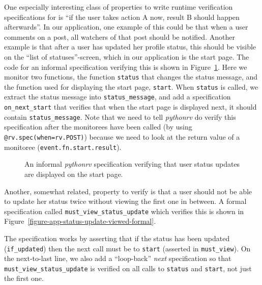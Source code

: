 One especially interesting class of properties to write runtime verification
specifications for is ``if the user takes action A now, result B should happen
afterwards''. In our application, one example of this could be that when a user
comments on a post, all watchers of that post should be notified. Another
example is that after a user has updated her profile status, this should
be visible on the ``list of statuses''-screen, which in our application is the
start page. The code for an informal specification verifying this is shown in
Figure~\ref{figure-app-status-update-displayed-informal}. Here we monitor two
functions, the function \texttt{status} that changes the status message, and
the function used for displaying the start page, \texttt{start}. When
\texttt{status} is called, we extract the status message into
\texttt{status\_message}, and add a specification \texttt{on\_next\_start} that
verifies that when the start page is displayed next, it should contain
\texttt{status\_message}. Note that we need to tell \textit{pythonrv} do verify
this specification after the monitorees have been called (by using
\texttt{@rv.spec(when=rv.POST)}) because we need to look at the return value of
a monitoree (\texttt{event.fn.start.result}).

\begin{figure}[h!]
	\begin{center}
	\begin{minipage}{0.9\textwidth}
	
	\end{minipage}
	\end{center}

  \caption{An informal \textit{pythonrv} specification verifying that user
    status updates are displayed on the start page.}
	\label{figure-app-status-update-displayed-informal}
\end{figure}

Another, somewhat related, property to verify is that a user should not be able
to update her status twice without viewing the first one in between. A formal
specification called \texttt{must\_view\_status\_update} which verifies this is
shown in Figure~\ref{figure-app-status-update-viewed-formal}.

The specification works by asserting that if the status has been updated
(\texttt{if\_updated}) then the next call must be to \texttt{start}
(asserted in \texttt{must\_view}). On the next-to-last line, we also add a
``loop-back'' \textit{next} specification so that
\texttt{must\_view\_status\_update} is verified on all calls to \texttt{status}
and \texttt{start}, not just the first one.


